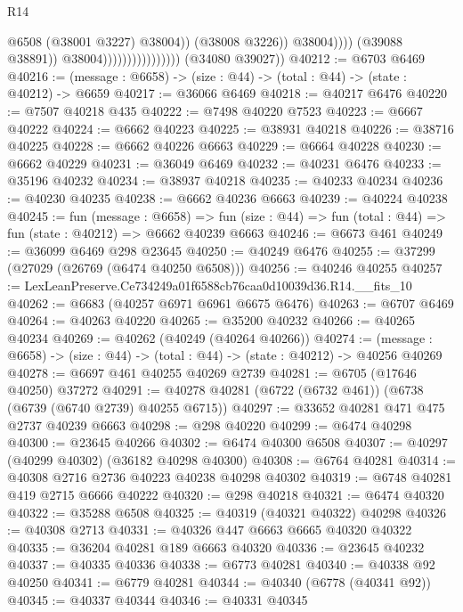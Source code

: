 \begin{lexlean}{R14}
\begin{coremodule}
                                                      @6508
                                                      (@38001 @3227)
                                                      @38004))
                                                  (@38008 @3226))
                                                @38004))))
                                        (@39088 @38891))
                                      @38004))))))))))))))))
      (@34080 @39027))
@40212 := @6703 @6469
@40216 := (message : @6658) -> (size : @44) -> (total : @44) -> (state : @40212) -> @6659
@40217 := @36066 @6469
@40218 := @40217 @6476
@40220 := @7507 @40218 @435
@40222 := @7498 @40220 @7523
@40223 := @6667 @40222
@40224 := @6662 @40223
@40225 := @38931 @40218
@40226 := @38716 @40225
@40228 := @6662 @40226 @6663
@40229 := @6664 @40228
@40230 := @6662 @40229
@40231 := @36049 @6469
@40232 := @40231 @6476
@40233 := @35196 @40232
@40234 := @38937 @40218
@40235 := @40233 @40234
@40236 := @40230 @40235
@40238 := @6662 @40236 @6663
@40239 := @40224 @40238
@40245 := fun (message : @6658) =>
  fun (size : @44) => fun (total : @44) => fun (state : @40212) => @6662 @40239 @6663
@40246 := @6673 @461
@40249 := @36099 @6469 @298 @23645
@40250 := @40249 @6476
@40255 := @37299 (@27029 (@26769 (@6474 @40250 @6508)))
@40256 := @40246 @40255
@40257 := LexLeanPreserve.Ce734249a01f6588cb76caa0d10039d36.R14.__fits_10
@40262 := @6683 (@40257 @6971 @6961 @6675 @6476)
@40263 := @6707 @6469
@40264 := @40263 @40220
@40265 := @35200 @40232
@40266 := @40265 @40234
@40269 := @40262 (@40249 (@40264 @40266))
@40274 := (message : @6658) -> (size : @44) -> (total : @44) -> (state : @40212) -> @40256 @40269
@40278 := @6697 @461 @40255 @40269 @2739
@40281 := @6705 (@17646 @40250) @37272
@40291 := @40278 @40281 (@6722 (@6732 @461)) (@6738 (@6739 (@6740 @2739) @40255 @6715))
@40297 := @33652 @40281 @471 @475 @2737 @40239 @6663
@40298 := @298 @40220
@40299 := @6474 @40298
@40300 := @23645 @40266
@40302 := @6474 @40300 @6508
@40307 := @40297 (@40299 @40302) (@36182 @40298 @40300)
@40308 := @6764 @40281
@40314 := @40308 @2716 @2736 @40223 @40238 @40298 @40302
@40319 := @6748 @40281 @419 @2715 @6666 @40222
@40320 := @298 @40218
@40321 := @6474 @40320
@40322 := @35288 @6508
@40325 := @40319 (@40321 @40322) @40298
@40326 := @40308 @2713
@40331 := @40326 @447 @6663 @6665 @40320 @40322
@40335 := @36204 @40281 @189 @6663 @40320
@40336 := @23645 @40232
@40337 := @40335 @40336
@40338 := @6773 @40281
@40340 := @40338 @92 @40250
@40341 := @6779 @40281
@40344 := @40340 (@6778 (@40341 @92))
@40345 := @40337 @40344
@40346 := @40331 @40345

\end{coremodule}
\end{lexlean}
